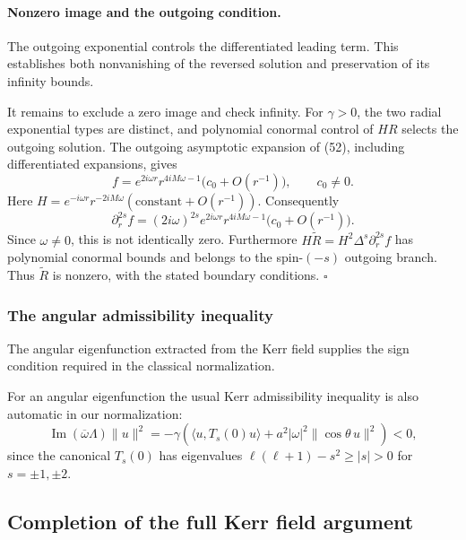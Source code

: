 \documentclass[11pt,a4paper]{article}
\begin{document}
\paragraph{Nonzero image and the outgoing condition.}\label{readable-kerr-reversal-infinity}

The outgoing exponential controls the differentiated leading term. This establishes both nonvanishing of the reversed solution and preservation of its infinity bounds.

It remains to exclude a zero image and check infinity. For \(\gamma>0\),
the two radial exponential types are distinct, and polynomial conormal
control of \(HR\) selects the outgoing solution. The outgoing asymptotic
expansion of (52), including differentiated expansions, gives \[
 f=e^{2i\omega r}r^{4iM\omega-1}
       \bigl(c_0+O(r^{-1})\bigr),\qquad c_0\ne0.
 \tag{57}
\] Here \(H=e^{-i\omega r}r^{-2iM\omega}
(\text{constant}+O(r^{-1}))\). Consequently \[
 \partial_r^{2s}f=(2i\omega)^{2s}
 e^{2i\omega r}r^{4iM\omega-1}
       \bigl(c_0+O(r^{-1})\bigr).
 \tag{58}
\] Since \(\omega\ne0\), this is not identically zero. Furthermore
\(H\widetilde R=H^2\Delta^s\partial_r^{2s}f\) has polynomial conormal
bounds and belongs to the spin-\((-s)\) outgoing branch. Thus
\(\widetilde R\) is nonzero, with the stated boundary conditions.
\(\square\)

\subsubsection{The angular admissibility inequality}\label{readable-kerr-admissibility}

The angular eigenfunction extracted from the Kerr field supplies the sign condition required in the classical normalization.

For an angular eigenfunction the usual Kerr admissibility inequality is
also automatic in our normalization: \[
 \operatorname{Im}(\overline\omega\Lambda)\|u\|^2
 =-\gamma\left(\langle u,T_s(0)u\rangle
             +a^2|\omega|^2\|\cos\theta\,u\|^2\right)<0,
 \tag{59}
\] since the canonical \(T_s(0)\) has eigenvalues
\(\ell(\ell+1)-s^2\ge |s|>0\) for \(s=\pm1,\pm2\).

\subsection{Completion of the full Kerr field
argument}\label{completion-of-the-full-kerr-field-argument}
\end{document}
